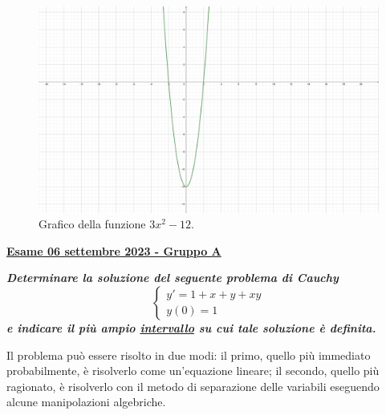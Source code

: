 \documentclass[a4paper]{article}
\newcommand{\definition}[1]{\textcolor{Red3}{\textbf{#1}}}
\newcommand{\example}[1]{\textcolor{Green4}{\textbf{#1}}}
\begin{document}
	\begin{figure}[!htp]
		\centering
		\includegraphics[width=.6\textwidth]{img/exercise/2023-06-21-A-ex1.pdf}
		\caption{Grafico della funzione $3x^{2}-12$.}
	\end{figure}\newpage

	\begin{flushleft}
		\definition{\underline{Esame 06 settembre 2023 - Gruppo A}}
		\label{exam: esame 06 settembre 2023 - Gruppo A - 1 esercizio}
	\end{flushleft}
	\example{\emph{Determinare la soluzione del seguente problema di Cauchy}
	\begin{equation*}
		\begin{cases}
			y' = 1 + x + y + xy \\
			y\left(0\right) = 1
		\end{cases}
	\end{equation*}
	\emph{e indicare il più ampio \underline{intervallo} su cui tale soluzione è definita.}}\newline

	\noindent
	Il problema può essere risolto in due modi: il primo, quello più immediato probabilmente, è risolverlo come un'equazione lineare; il secondo, quello più ragionato, è risolverlo con il metodo di separazione delle variabili eseguendo alcune manipolazioni algebriche.\newline
\end{document}
